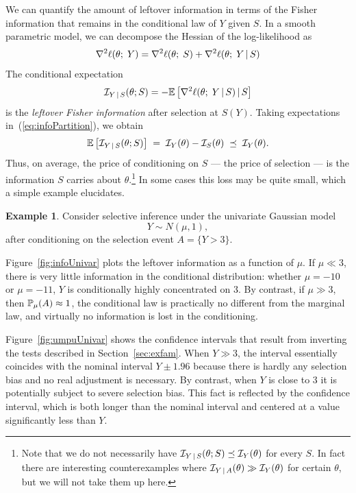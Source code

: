 \documentclass{article}
\theoremstyle{definition}
\newtheorem{example}{Example}
\newcommand{\cI}{\mathcal{I}}
\begin{document}
We can quantify the amount of leftover information in terms of the Fisher information that remains in the conditional law of $Y$ given $S$. In a smooth parametric model, we can decompose the Hessian of the log-likelihood as
\begin{equation}\label{eq:infoPartition}
  \grad^2 \ell(\theta;\;Y) = \grad^2 \ell(\theta; \;S) + \grad^2 \ell(\theta; \;Y \gv S)
\end{equation}
The conditional expectation
\begin{equation}
  \cI_{Y\gv S}(\theta; S) = -\E\left[\grad^2 \ell(\theta;\;Y \gv S) \gv S\right]
\end{equation}
is the {\em leftover Fisher information} after selection at $S(Y)$.
Taking expectations in~(\ref{eq:infoPartition}), we obtain
\begin{equation}
  \E\left[\cI_{Y\gv S}(\theta; S)\right] \;=\; \cI_Y(\theta) - \cI_S(\theta) \;\preceq\; \cI_Y(\theta).
\end{equation}
Thus, on average, the price of conditioning on $S$ --- the price of selection --- is the information $S$ carries about $\theta$.\footnote{Note that we do not necessarily have $\cI_{Y\gv S}(\theta; S) \preceq \cI_Y(\theta)$ for every $S$. In fact there are interesting counterexamples where $\cI_{Y\gv A}(\theta) \gg \cI_{Y}(\theta)$ for certain $\theta$, but we will not take them up here.}
 In some cases this loss may be quite small, which a simple example elucidates.



\begin{example}\label{ex:univar}
Consider selective inference under the univariate Gaussian model
\begin{equation}
  Y \sim N(\mu, 1),
\end{equation}
after conditioning on the selection event $A = \{Y > 3\}$.

Figure~\ref{fig:infoUnivar} plots the leftover information as a function of $\mu$. If $\mu\ll 3$, there is very little information in the conditional distribution: whether $\mu = -10$ or $\mu=-11$, $Y$ is conditionally highly concentrated on 3. By contrast, if $\mu \gg 3$, then $\P_\mu(A) \approx 1$, the conditional law is practically no different from the marginal law, and virtually no information is lost in the conditioning.

Figure~\ref{fig:umpuUnivar} shows the confidence intervals that result from inverting the tests described in Section~\ref{sec:exfam}. When $Y\gg 3$, the interval essentially coincides with the nominal interval $Y \pm 1.96$ because there is hardly any selection bias and no real adjustment is necessary. By contrast, when $Y$ is close to 3 it is potentially subject to severe selection bias. This fact is reflected by the confidence interval, which is both longer than the nominal interval and centered at a value significantly less than $Y$.
\end{example}
\end{document}
